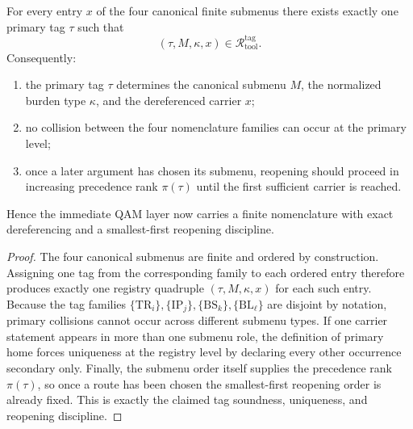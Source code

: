 \begin{proposition}
\label{prop:tag-soundness-uniqueness-minimal-reopening-discipline}
For every entry \(x\) of the four canonical finite submenus there exists exactly one primary tag \(\tau\) such that
\[
(\tau,M,\kappa,x)\in \mathcal R^{\mathrm{tag}}_{\mathrm{tool}}.
\]
Consequently:
\begin{enumerate}[leftmargin=2em]
  \item the primary tag \(\tau\) determines the canonical submenu \(M\), the normalized burden type \(\kappa\), and the dereferenced carrier \(x\);
  \item no collision between the four nomenclature families can occur at the primary level;
  \item once a later argument has chosen its submenu, reopening should proceed in increasing precedence rank \(\pi(\tau)\) until the first sufficient carrier is reached.
\end{enumerate}
Hence the immediate QAM layer now carries a finite nomenclature with exact dereferencing and a smallest-first reopening discipline.
\end{proposition}

\begin{proof}
The four canonical submenus are finite and ordered by construction. Assigning one tag from the corresponding family to each ordered entry therefore produces exactly one registry quadruple \((\tau,M,\kappa,x)\) for each such entry. Because the tag families \(\{\mathrm{TR}_i\}, \{\mathrm{IP}_j\}, \{\mathrm{BS}_k\}, \{\mathrm{BL}_\ell\}\) are disjoint by notation, primary collisions cannot occur across different submenu types. If one carrier statement appears in more than one submenu role, the definition of primary home forces uniqueness at the registry level by declaring every other occurrence secondary only. Finally, the submenu order itself supplies the precedence rank \(\pi(\tau)\), so once a route has been chosen the smallest-first reopening order is already fixed. This is exactly the claimed tag soundness, uniqueness, and reopening discipline.
\end{proof}

